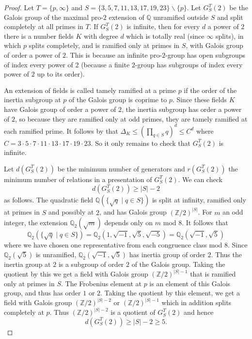 \documentclass{amsart}
\numberwithin{equation}{section}
\begin{document}
\begin{proof} Let $T = \{p,\infty\}$ and $S=\{3,5,7,11,13,17,19,23\}\backslash \{p\}$. Let $G_S^T(2)$ be the Galois group of the maximal pro-$2$ extension of $\mathbb Q$ unramified outside $S$ and split completely at all primes in $T$. If $G_S^T(2)$ is infinite, then for every $d$ a power of $2$  there is a number fields $K$ with degree $d$ which is totally real (since $\infty$ splits), in which $p$ splits completely, and is ramified only at primes in $S$, with Galois group of order a power of $2$. This is because an infinite pro-$2$-group has open subgroups of index every power of $2$ (because a finite $2$-group has subgroups of index every power of $2$ up to its order).

An extension of fields is called tamely ramified at a prime $p$ if the order of the inertia subgroup at $p$ of the Galois group is coprime to $p$. Since these fields $K$ have Galois group of order a power of $2$, the inertia subgroup has order a power of $2$, so because they are ramified only at odd primes, they are tamely ramified at each ramified prime. It follows by \cite[III, Theorem 2.6]{Ne99} that $\Delta_K \leq (\prod_{q\in S} q )^d \leq C^d$ where $C= 3\cdot 5 \cdot 7 \cdot 11 \cdot 13 \cdot 17 \cdot 19 \cdot 23$. So it only remains to check that $G_S^T(2)$ is infinite.

Let $d(G_S^T(2))$ be the minimum number of generators and $r(G_S^T(2))$ the minimum number of relations in a presentation of $G_S^T(2)$. We can check \[ d(G_S^T(2)) \geq |S|-2\] as follows.  The quadratic field $\mathbb Q( \{ \sqrt{q} \mid q \in S\})$ is split at infinity, ramified only at primes in $S$ and possibly at $2$, and has Galois group $(\mathbb Z/2)^{|S|}$. For $m$ an odd integer, the extension $\mathbb Q_2(\sqrt{m})$ depends only on $m$ mod $8$. It follows that \[\mathbb Q_2( \{ \sqrt{q} \mid q \in S\})= \mathbb Q_2( 1,\sqrt{-1}, \sqrt{5},\sqrt{-5})=\mathbb Q_2( \sqrt{-1},\sqrt{5})\] where we have chosen one representative from each congruence class mod $8$. Since $\mathbb Q_2(\sqrt{5})$ is unramified, $\mathbb Q_2( \sqrt{-1},\sqrt{5})$ has inertia group of order $2$. Thus the inertia group at $2$ is a subgroup of order $2$ of the Galois group. Taking the quotient by this we get a field with Galois group $(\mathbb Z/2)^{|S|-1}$ that is ramified only at primes in $S$. The Frobenius element at $p$ is an element of this Galois group, and thus has order $1$ or $2$. Taking the quotient by this element, we get a field with Galois group $(\mathbb Z/2)^{|S|-2}$ or $(\mathbb Z/2)^{|S|-1}$ which in addition splits completely at $p$. Thus $(\mathbb Z/2)^{|S|-2}$ is a quotient of $G_S^T(2)$ and hence 
\begin{equation}\label{Zp-case-1} d(G_S^T(2)) \geq |S|-2\geq 5.\end{equation} 



\end{proof}
\end{document}
